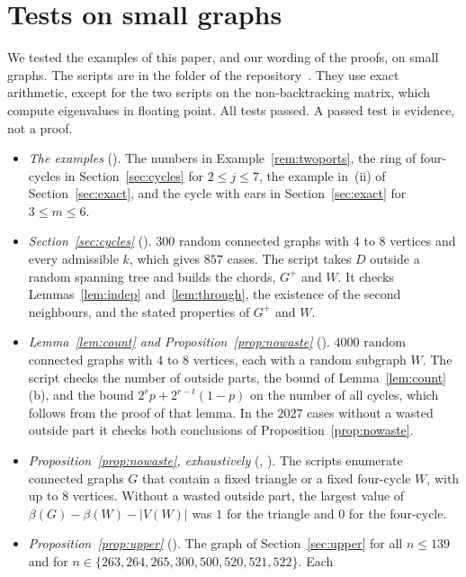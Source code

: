 \section{Tests on small graphs}\label{app:checks}

We tested the examples of this paper, and our wording of the proofs, on small graphs. The scripts
are in the folder  of the repository~\cite{Repo}. They use
exact arithmetic, except for the two scripts on the non-backtracking matrix, which compute
eigenvalues in floating point. All tests passed. A passed test is evidence, not a proof.

\begin{itemize}
\item \emph{The examples} (). The numbers in Example~\ref{rem:twoports},
the ring of four-cycles in Section~\ref{sec:cycles} for $2\le j\le7$, the example in~(ii) of
Section~\ref{sec:exact}, and the cycle with ears in Section~\ref{sec:exact} for $3\le m\le6$.
\item \emph{Section~\ref{sec:cycles}} (). $300$ random connected graphs with
$4$ to $8$ vertices and every admissible $k$, which gives $857$ cases. The script takes $D$ outside a
random spanning tree and builds the chords, $G^{+}$ and $W$. It checks Lemmas~\ref{lem:indep}
and~\ref{lem:through}, the existence of the second neighbours, and the stated properties of
$G^{+}$ and $W$.
\item \emph{Lemma~\ref{lem:count} and Proposition~\ref{prop:nowaste}}
(). $4000$ random connected graphs with $4$ to $8$ vertices, each with a
random subgraph $W$. The script checks the number of outside parts, the bound of
Lemma~\ref{lem:count}(b), and the bound $2^{r}p+2^{r-t}(1-p)$ on the number of all cycles, which
follows from the proof of that lemma. In the $2027$ cases without a wasted outside part it checks
both conclusions of Proposition~\ref{prop:nowaste}.
\item \emph{Proposition~\ref{prop:nowaste}, exhaustively} (,
). The scripts enumerate connected graphs $G$ that contain a fixed triangle
or a fixed four-cycle $W$, with up to $8$ vertices. Without a wasted outside part, the largest
value of $\beta(G)-\beta(W)-|V(W)|$ was $1$ for the triangle and $0$ for the four-cycle.
\item \emph{Proposition~\ref{prop:upper}} (). The graph of
Section~\ref{sec:upper} for all $n\le139$ and for $n\in\{263,264,265,300,500,520,521,522\}$. Each

\end{itemize}
